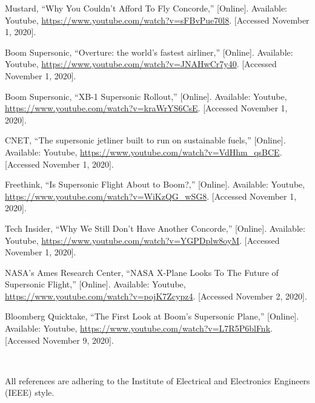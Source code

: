 \documentclass[a4paper,11pt]{article}
\begin{document}
\begin{thebibliography}
{Mustard},
{``Why You Couldn’t Afford To Fly Concorde,''}
[Online]. Available: Youtube,
\url{https://www.youtube.com/watch?v=sFBvPue70l8}.
[Accessed November 1, 2020].

{Boom Supersonic},
{``Overture: the world's fastest airliner,''}
[Online]. Available: Youtube,
\url{https://www.youtube.com/watch?v=JNAHwCr7y40}.
[Accessed November 1, 2020].

{Boom Supersonic},
{``XB-1 Supersonic Rollout,''}
[Online]. Available: Youtube,
\url{https://www.youtube.com/watch?v=kraWrYS6CsE}.
[Accessed November 1, 2020].

{CNET},
{``The supersonic jetliner built to run on sustainable fuels,''}
[Online]. Available: Youtube,
\url{https://www.youtube.com/watch?v=VdHhm_qsBCE}.
[Accessed November 1, 2020].

{Freethink},
{``Is Supersonic Flight About to Boom?,''}
[Online]. Available: Youtube,
\url{https://www.youtube.com/watch?v=WiKzQG_wSG8}.
[Accessed November 1, 2020].

{Tech Insider},
{``Why We Still Don't Have Another Concorde,''}
[Online]. Available: Youtube,
\url{https://www.youtube.com/watch?v=YGPDplw8oyM}.
[Accessed November 1, 2020].

{NASA's Ames Research Center},
{``NASA X-Plane Looks To The Future of Supersonic Flight,''}
[Online]. Available: Youtube,
\url{https://www.youtube.com/watch?v=pojK7Zcypz4}.
[Accessed November 2, 2020].

{Bloomberg Quicktake},
{``The First Look at Boom’s Supersonic Plane,''}
[Online]. Available: Youtube,
\url{https://www.youtube.com/watch?v=L7R5P6blFnk}.
[Accessed November 9, 2020].

\end{thebibliography}

\vspace*{\fill}

\hrulefill \\
\begin{footnotesize}\indent *All references are adhering to the Institute of Electrical and Electronics Engineers (IEEE) style.\end{footnotesize}
\end{document}
